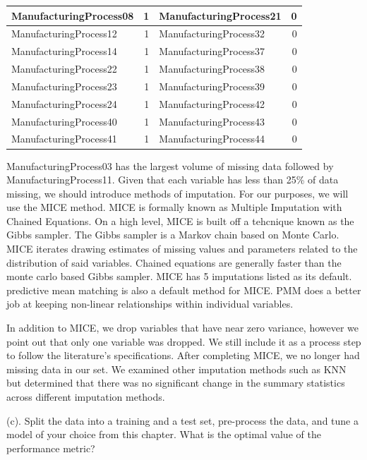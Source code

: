 \documentclass[]{report}
\begin{document}
\begin{table}[H]
\begin{tabular}[t]{l|r|l|r}
\hline
\rowcolor{gray!6}  ManufacturingProcess08 & 1 & ManufacturingProcess21 & 0\\
\hline
ManufacturingProcess12 & 1 & ManufacturingProcess32 & 0\\
\hline
\rowcolor{gray!6}  ManufacturingProcess14 & 1 & ManufacturingProcess37 & 0\\
\hline
ManufacturingProcess22 & 1 & ManufacturingProcess38 & 0\\
\hline
\rowcolor{gray!6}  ManufacturingProcess23 & 1 & ManufacturingProcess39 & 0\\
\hline
ManufacturingProcess24 & 1 & ManufacturingProcess42 & 0\\
\hline
\rowcolor{gray!6}  ManufacturingProcess40 & 1 & ManufacturingProcess43 & 0\\
\hline
ManufacturingProcess41 & 1 & ManufacturingProcess44 & 0\\
\hline
\end{tabular}
\end{table}

ManufacturingProcess03 has the largest volume of missing data followed
by ManufacturingProcess11. Given that each variable has less than 25\%
of data missing, we should introduce methods of imputation. For our
purposes, we will use the MICE method. MICE is formally known as
Multiple Imputation with Chained Equations. On a high level, MICE is
built off a tehcnique known as the Gibbs sampler. The Gibbs sampler is a
Markov chain based on Monte Carlo. MICE iterates drawing estimates of
missing values and parameters related to the distribution of said
variables. Chained equations are generally faster than the monte carlo
based Gibbs sampler. MICE has 5 imputations listed as its default.
predictive mean matching is also a default method for MICE. PMM does a
better job at keeping non-linear relationships within individual
variables.

In addition to MICE, we drop variables that have near zero variance,
however we point out that only one variable was dropped. We still
include it as a process step to follow the literature's specifications.
After completing MICE, we no longer had missing data in our set. We
examined other imputation methods such as KNN but determined that there
was no significant change in the summary statistics across different
imputation methods.

\begin{subquestion}{(c).} Split the data into a training and a test set, pre-process the data, and tune a model of your choice from this chapter. What is the optimal value of the performance metric? 
\end{subquestion}
\end{document}
